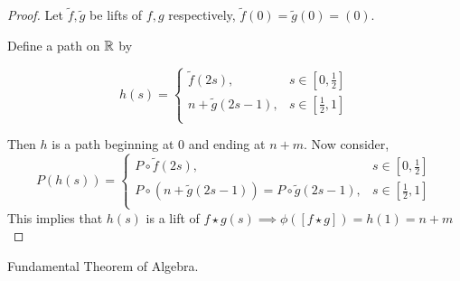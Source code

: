 \documentclass[12pt]{amsart}
\begin{document}
\begin{proof}
    Let $\widetilde{f}, \widetilde{g}$ be lifts of $f, g$ respectively, $\widetilde{f}(0) = \widetilde{g}(0) = (0)$. 

    Define a path on $\mathbb R$ by 
    
    \[h(s) = \begin{cases}
        \widetilde{f}(2s),  &s \in \left[0, \frac{1}{2}\right] \\ 
        n + \widetilde{g}(2s-1),  &s \in \left[\frac{1}{2}, 1\right] \\ 
    \end{cases}\]

    Then $h$ is a path beginning at $0$ and ending at $n+m$. Now consider, 
    \[P(h(s))= \begin{cases}
        P \circ \widetilde{f}(2s),  &s \in \left[0, \frac{1}{2}\right] \\ 
        P \circ (n + \widetilde{g}(2s-1)) = P \circ \widetilde{g}(2s-1),  &s \in \left[\frac{1}{2}, 1\right] \\ 
    \end{cases} \]
    This implies that $h(s)$ is a lift of $f \star g(s) \implies \phi([f \star g]) = h(1) = n + m$
\end{proof}

\begin{corollary}
    Fundamental Theorem of Algebra.
\end{corollary}
\end{document}
